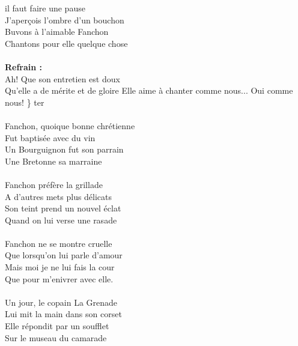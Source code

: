 
 il faut faire une pause
\\J'aperçois l'ombre d'un bouchon
\\Buvons à l'aimable Fanchon
\\Chantons pour elle quelque chose
\\\\\textbf{Refrain :}
\\Ah! Que son entretien est doux
\\Qu'elle a de mérite et de gloire
{Elle aime à chanter comme nous...}
Oui comme nous! \} ter
\\\\Fanchon, quoique bonne chrétienne
\\Fut baptisée avec du vin
\\Un Bourguignon fut son parrain
\\Une Bretonne sa marraine
\\\\Fanchon préfère la grillade
\\A d'autres mets plus délicats
\\Son teint prend un nouvel éclat
\\Quand on lui verse une rasade
\\\\Fanchon ne se montre cruelle
\\Que lorsqu'on lui parle d'amour
\\Mais moi je ne lui fais la cour
\\Que pour m'enivrer avec elle.
\\\\Un jour, le copain La Grenade
\\Lui mit la main dans son corset
\\Elle répondit par un soufflet
\\Sur le museau du camarade
\breakpage


